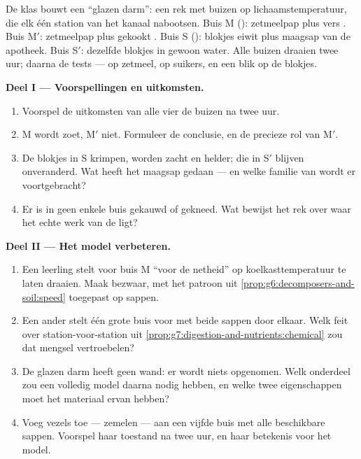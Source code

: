 \begin{problem}\label{pb:g7:digestion-and-nutrients:1}
De klas bouwt een ``glazen darm'': een rek met buizen op
lichaamstemperatuur, die elk één station van het kanaal nabootsen. Buis M
(): zetmeelpap plus vers . Buis M$'$: zetmeelpap plus gekookt
. Buis S (): blokjes eiwit plus maagsap van de
apotheek. Buis S$'$: dezelfde blokjes in gewoon water. Alle buizen draaien
twee uur; daarna de tests --- op zetmeel, op suikers, en een blik op de
blokjes.

\medskip\noindent\textbf{Deel I --- Voorspellingen en
uitkomsten.}
\begin{enumerate}
  \item Voorspel de uitkomsten van alle vier de buizen na twee uur.
  \item M wordt zoet, M$'$ niet. Formuleer de conclusie, en de precieze
        rol van M$'$.
  \item De blokjes in S krimpen, worden zacht en helder; die in S$'$
        blijven onveranderd. Wat heeft het maagsap gedaan --- en welke
        familie van  wordt er voortgebracht?
  \item Er is in geen enkele buis gekauwd of gekneed. Wat bewijst het rek
        over waar het echte werk van de  ligt?
\end{enumerate}

\medskip\noindent\textbf{Deel II --- Het model verbeteren.}
\begin{enumerate}[resume]
  \item Een leerling stelt voor buis M ``voor de netheid'' op
        koelkasttemperatuur te laten draaien. Maak bezwaar, met het
        patroon uit \cref{prop:g6:decomposers-and-soil:speed} toegepast
        op sappen.
  \item Een ander stelt één grote buis voor met beide sappen door elkaar.
        Welk feit over station-voor-station uit
        \cref{prop:g7:digestion-and-nutrients:chemical} zou dat mengsel
        vertroebelen?
  \item De glazen darm heeft geen wand: er wordt niets opgenomen. Welk
        onderdeel zou een volledig model daarna nodig hebben, en welke
        twee eigenschappen moet het materiaal ervan hebben?
  \item Voeg vezels toe --- zemelen --- aan een vijfde buis met alle
        beschikbare sappen. Voorspel haar toestand na twee uur, en haar
        betekenis voor het model.
\end{enumerate}


\end{problem}

